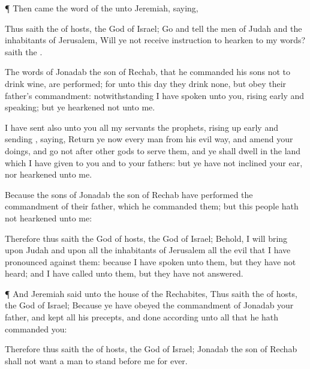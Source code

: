 {\par }{\PP {}¶ Then came the
word of the
{} unto
Jeremiah,
saying,

Thus
saith the
{} of
hosts, the
God of
Israel;
Go and
tell the
men of
Judah and the
inhabitants of
Jerusalem, Will ye not
receive
instruction to
hearken to my
words?
saith the
{}.

The
words of
Jonadab the
son of
Rechab, that he
commanded his
sons not to
drink
wine, are
performed; for unto this
day they
drink none, but
obey their
father’s
commandment: notwithstanding I have
spoken unto you, rising
early and
speaking; but ye
hearkened not unto me.

I have
sent also unto you all my
servants the
prophets, rising up
early and
sending
{},
saying,
Return ye now every
man from his
evil
way, and
amend your
doings, and
go not
after
other
gods to
serve them, and ye shall dwell
in the
land which I have
given to you and to your
fathers: but ye have not
inclined your
ear, nor
hearkened unto me.

Because the
sons of
Jonadab the
son of
Rechab have
performed the
commandment of their
father, which he
commanded them; but this
people hath not
hearkened unto me:

Therefore thus
saith the
{}
God of
hosts, the
God of
Israel; Behold, I will
bring upon
Judah and upon all the
inhabitants of
Jerusalem all the
evil that I have
pronounced against them: because I have
spoken unto them, but they have not
heard; and I have
called unto them, but they have not
answered.


\par }{\PP {}¶ And
Jeremiah
said unto the
house of the
Rechabites, Thus
saith the
{} of
hosts, the
God of
Israel; Because ye have
obeyed the
commandment of
Jonadab your
father, and
kept all his
precepts, and
done according unto all that he hath
commanded you:

Therefore thus
saith the
{} of
hosts, the
God of
Israel;
Jonadab the
son of
Rechab shall not
want a
man to
stand
before me for
ever.




\par }
